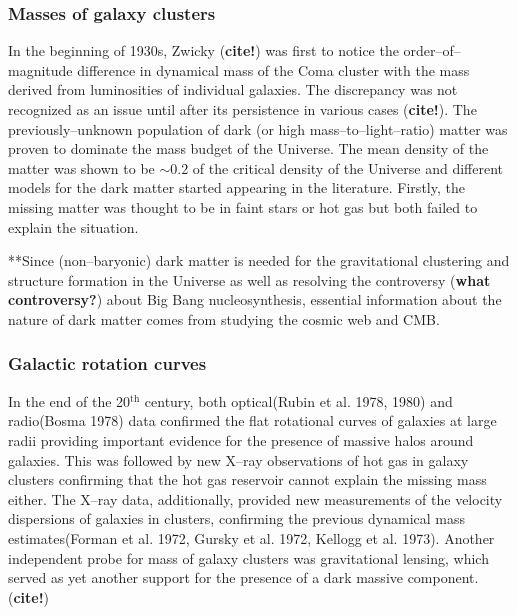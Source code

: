 \documentclass[paper=a4, fontsize=11pt]{scrartcl} %
\numberwithin{equation}{section} %
\numberwithin{figure}{section} %
\numberwithin{table}{section} %
\newcommand{\ignore}[1]{}
\begin{document}
\subsubsection{Masses of galaxy clusters}
In the beginning of 1930s, Zwicky ({\bf cite!}) was first to notice the order--of--magnitude difference in dynamical mass of the Coma cluster with the mass derived from luminosities of individual galaxies. The discrepancy was not recognized as an issue until after its persistence in various cases ({\bf cite!})\ignore{cite Kahn \& Woltjer 1959 about the Andromeda's negative redshift and masses of galaxy groups Holmberg 1937! or rather just focus on rotational curve discrepancies whose agreement needs a new population of stars tenfold the regular ones in the galaxy with very large M/L  Einasto et al. 1974 ans Ostriker et al. 1974}. The previously--unknown population of dark (or high mass--to--light--ratio) matter was proven to dominate the mass budget of the Universe. The mean density of the matter was shown to be $\sim 0.2$ of the critical density of the Universe and different models for the dark matter started appearing in the literature. Firstly, the missing matter was thought to be in faint stars or hot gas but both failed to explain the situation\ignore{cite and explain why! or maybe not as it's not really important now!!}.

**Since (non--baryonic) dark matter is needed for the gravitational clustering and structure formation in the Universe as well as resolving the controversy ({\bf what controversy?}) about Big Bang nucleosynthesis, essential information about the nature of dark matter comes from studying the cosmic web and CMB.

\subsubsection{Galactic rotation curves}
In the end of the 20$^\mathrm{th}$ century, both optical(Rubin et al. 1978, 1980) and radio(Bosma 1978) data confirmed the flat rotational curves of galaxies at large radii providing important evidence for the presence of massive halos around galaxies. This was followed by new X--ray observations of hot gas in galaxy clusters confirming that the hot gas reservoir cannot explain the missing mass either. The X--ray data, additionally, provided new measurements of the velocity dispersions of galaxies in clusters, confirming the previous dynamical mass estimates(Forman et al. 1972, Gursky et al. 1972, Kellogg et al. 1973). Another independent probe for mass of galaxy clusters was gravitational lensing, which served as yet another support for the presence of a dark massive component.({\bf cite!})
\end{document}
